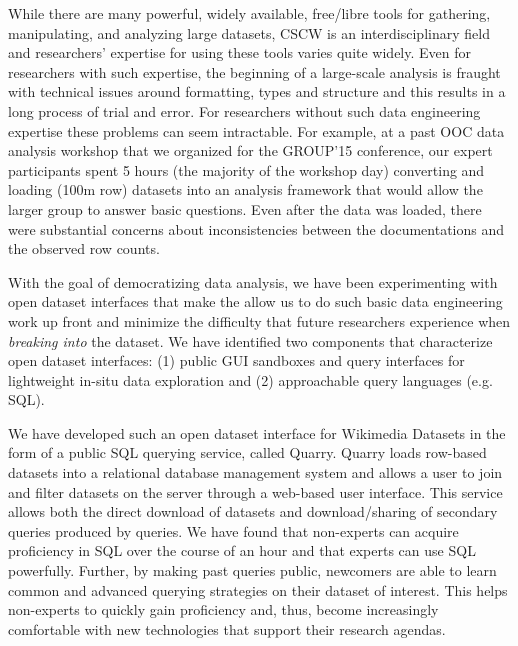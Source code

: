 While there are many powerful, widely available, free/libre tools for gathering, manipulating, and analyzing large datasets, CSCW is an interdisciplinary field and  researchers' expertise for using these tools varies quite widely.  Even for researchers with such expertise, the beginning of a large-scale analysis is fraught with technical issues around formatting, types and structure and this results in a long process of trial and error. For researchers without such data engineering expertise these problems can seem intractable.  For example, at a past OOC data analysis workshop that we organized for the GROUP'15 conference, our expert participants spent 5 hours (the majority of the workshop day) converting and loading (100m row) datasets into an analysis framework that would allow the larger group to answer basic questions.  Even after the data was loaded, there were substantial concerns about inconsistencies between the documentations and the observed row counts.

With the goal of democratizing data analysis, we have been experimenting with open dataset interfaces that make the allow us to do such basic data engineering work up front and minimize the difficulty that future researchers experience when \emph{breaking into} the dataset.  We have identified two components that characterize open dataset interfaces: (1) public GUI sandboxes and query interfaces for lightweight in-situ data exploration and (2) approachable query languages (e.g. SQL).

We have developed such an open dataset interface for Wikimedia Datasets in the form of a public SQL querying service, called Quarry.  Quarry loads row-based datasets into a relational database management system and allows a user to join and filter datasets on the server through a web-based user interface.  This service allows both the direct download of datasets and download/sharing of secondary queries produced by queries.  We have found that non-experts can acquire proficiency in SQL over the course of an hour and that experts can use SQL powerfully.  Further, by making past queries public, newcomers are able to learn common and advanced querying strategies on their dataset of interest. This helps non-experts to quickly gain proficiency and, thus, become increasingly comfortable with new technologies that support their research agendas.

